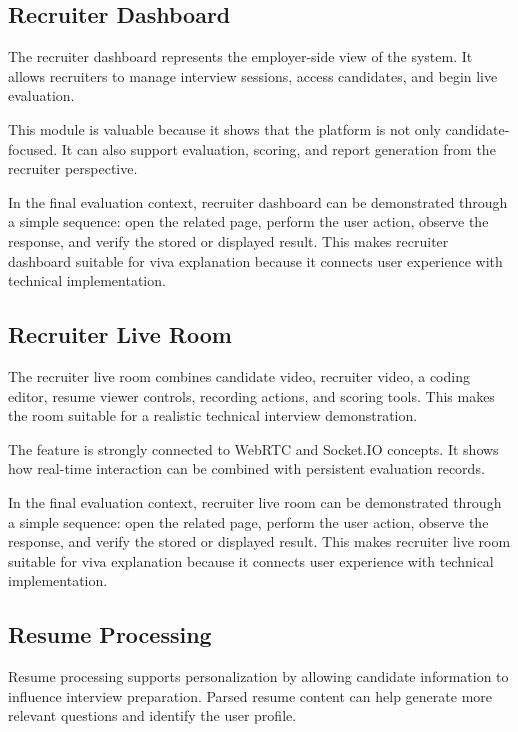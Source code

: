 \documentclass[12pt,a4paper]{report}
\begin{document}
\subsection{Recruiter Dashboard}

The recruiter dashboard represents the employer-side view of the system. It allows recruiters to manage interview sessions, access candidates, and begin live evaluation.

This module is valuable because it shows that the platform is not only candidate-focused. It can also support evaluation, scoring, and report generation from the recruiter perspective.

In the final evaluation context, recruiter dashboard can be demonstrated through a simple sequence: open the related page, perform the user action, observe the response, and verify the stored or displayed result. This makes recruiter dashboard suitable for viva explanation because it connects user experience with technical implementation.

\subsection{Recruiter Live Room}

The recruiter live room combines candidate video, recruiter video, a coding editor, resume viewer controls, recording actions, and scoring tools. This makes the room suitable for a realistic technical interview demonstration.

The feature is strongly connected to WebRTC and Socket.IO concepts. It shows how real-time interaction can be combined with persistent evaluation records.

In the final evaluation context, recruiter live room can be demonstrated through a simple sequence: open the related page, perform the user action, observe the response, and verify the stored or displayed result. This makes recruiter live room suitable for viva explanation because it connects user experience with technical implementation.

\subsection{Resume Processing}

Resume processing supports personalization by allowing candidate information to influence interview preparation. Parsed resume content can help generate more relevant questions and identify the user profile.
\end{document}
